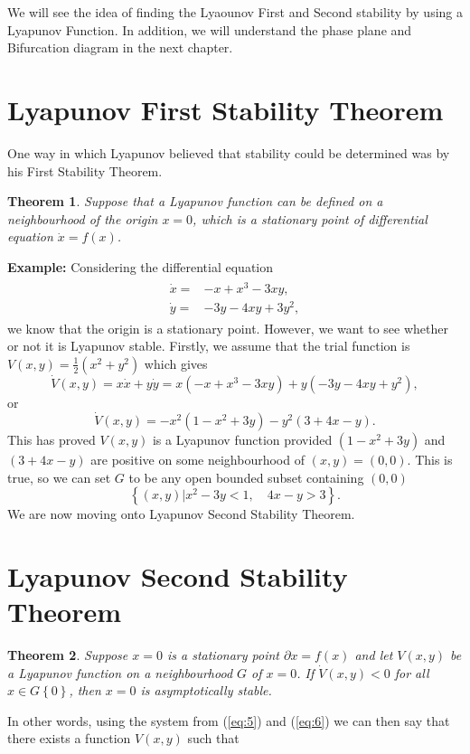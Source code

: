 \documentclass[a4paper]{report}
\newtheorem{thm}{Theorem}
\theoremstyle{definition}
\begin{document}
We will see the idea of finding the Lyaounov First and Second stability by using a Lyapunov Function. In addition, we will understand the phase plane and Bifurcation diagram in the next chapter.
\section{Lyapunov First Stability Theorem}
One way in which Lyapunov believed that stability could be determined was by his First Stability Theorem. 
\newline 
 \begin{mdframed}[backgroundcolor=airforceblue!25] 
\begin{thm} \label{thm:2}
 Suppose that a Lyapunov function can be defined on a neighbourhood of the origin $x=0$, which is a stationary point of differential equation $\dot{x}=f(x)$.
\end{thm}
\end{mdframed}
\textbf{Example:} Considering the differential equation 
\begin{align}
\begin{split}
\label{eq:7}
\dot{x}=&-x +x^3-3xy ,
\\ 
\dot{y}=&-3y-4xy+3y^2,
\end{split}
\end{align}
we know that the origin is a stationary point. However, we want to see whether or not it is Lyapunov stable. Firstly, we assume that the trial function is $V(x,y)=\frac{1}{2} (x^2+y^2)$ which gives
\begin{equation}
\dot{V}(x,y)=x\dot{x} + y\dot{y} = x(-x+x^3-3xy)+y(-3y-4xy+y^2),\label{eq:9} 
\end{equation}
or
\begin{equation}
\dot{V}(x,y)= -x^2(1-x^2+3y)-y^2(3+4x-y).\label{eq:10}
\end{equation}
This has proved $V(x,y)$ is a Lyapunov function provided $(1-x^2+3y)$ and $(3+4x-y)$ are positive on some neighbourhood of $(x,y)=(0,0)$. This is true, so we can set $G$ to be any open bounded subset containing $(0,0)$
\begin{equation}
\left\{(x,y)|x^2-3y<1, \quad 4x-y>3\right\}.\label{eq:11}
\end{equation}
We are now moving onto Lyapunov Second Stability Theorem.
\section{Lyapunov Second Stability Theorem}
  \begin{mdframed}[backgroundcolor=airforceblue!25] 
\begin{thm} \label{thm:3}
Suppose $x=0$ is a stationary point $\partial x=f(x)$ and let $V(x,y)$ be a Lyapunov function on a neighbourhood $G$ of $x=0$. If $\dot{V}(x,y)<0$ for all $x\in G\left\{0\right\}$, then $x=0$ is asymptotically stable.
\end{thm}
\end{mdframed}
In other words, using the system from (\ref{eq:5}) and (\ref{eq:6}) we can then say that there exists a function $V(x,y)$ such that
\end{document}
